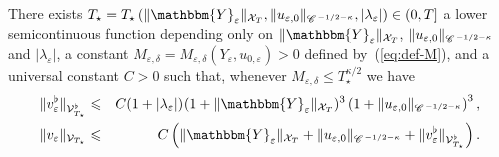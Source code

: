 \begin{lemma}
  \label{l:apriori-determ}There exists $T_{\star} = T_{\star} \left( \|
  \mathbbm{Y}_{\varepsilon} \|_{\mathcal{X}_T}, \| u_{\varepsilon, 0}
  \|_{\CC^{- 1 / 2 - \kappa}}, | \lambda_{\varepsilon} | \right) \in (0, T]$ a
  lower semicontinuous function depending only on $\|
  \mathbbm{Y}_{\varepsilon} \|_{\mathcal{X}_T}$, $\| u_{\varepsilon, 0}
  \|_{\mathscr{C} \hspace{.1em}^{- 1 / 2 - \kappa}}$ and $| \lambda_{\varepsilon} |$, a constant
  $M_{\varepsilon, \delta} = M_{\varepsilon, \delta} (Y_{\varepsilon}, u_{0,
  \varepsilon}) > 0$ defined by~(\ref{eq:def-M}), and a universal constant $C
  > 0$ such that, whenever $M_{\varepsilon, \delta} \leqslant
  T_{\star}^{\kappa / 2}$ we have
  \begin{eqnarray*}
    \| v^{\flat}_{\varepsilon} \|_{\mathcal{V}_{T_{\star}}^{\flat}} &
    \leqslant & C (1 + | \lambda_{\varepsilon} |)_{}  (1 + \|
    \mathbbm{Y}_{\varepsilon} \|_{\mathcal{X}_T})^3 \left( 1 + \|
    u_{\varepsilon, 0} \|_{\CC^{- 1 / 2 - \kappa}} \right)^3,\\
    \| v_{\varepsilon} \|_{\mathcal{V}_{T_{\star}}} & \leqslant & C \left( \|
    \mathbbm{Y}_{\varepsilon} \|_{\mathcal{X}_T} + \| u_{\varepsilon, 0}
    \|_{\CC^{- 1 / 2 - \kappa}} + \| v^{\flat}_{\varepsilon}
    \|_{\mathcal{V}_{T_{\star}}^{\flat}} \right) .
  \end{eqnarray*}
\end{lemma}

